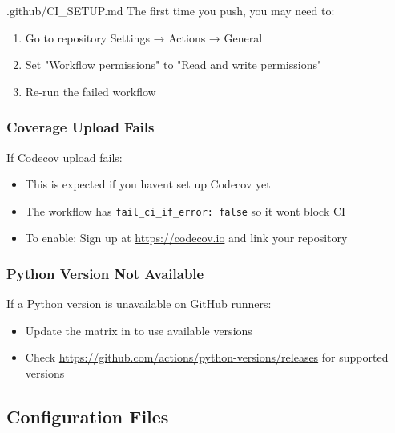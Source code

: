 \begin{relocated}{.github/CI_SETUP.md}
The first time you push, you may need to:

\begin{enumerate}
\def\labelenumi{\arabic{enumi}.}
\tightlist
\item
  Go to repository Settings → Actions → General
\item
  Set "Workflow permissions" to "Read and write permissions"
\item
  Re-run the failed workflow
\end{enumerate}

\subsubsection{Coverage Upload Fails}\label{um:flow:ci-setup:coverage-upload-fails}

If Codecov upload fails:

\begin{itemize}
\tightlist
\item
  This is expected if you haven\textquotesingle t set up Codecov yet
\item
  The workflow has
  \texttt{fail\_\allowbreak{}ci\_\allowbreak{}if\_\allowbreak{}error:\allowbreak{}\ false}
  so it won\textquotesingle t block CI
\item
  To enable: Sign up at
  \href{https://codecov.io}{https:/\allowbreak{}/\allowbreak{}codecov.io}
  and link your repository
\end{itemize}

\subsubsection{Python Version Not Available}\label{um:flow:ci-setup:python-version-not-available}

If a Python version is unavailable on GitHub runners:

\begin{itemize}
\tightlist
\item
  Update the matrix in  to use available versions
\item
  Check
  \href{https://github.com/actions/python-versions/releases}{https:/\allowbreak{}/\allowbreak{}github.com/\allowbreak{}actions/\allowbreak{}python-versions/\allowbreak{}releases}
  for supported versions
\end{itemize}

\subsection{Configuration Files}\label{um:flow:ci-setup:configuration-files}


\end{relocated}
